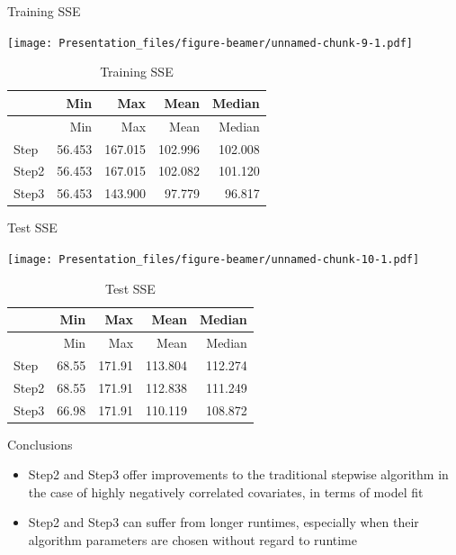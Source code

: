 \documentclass[ignorenonframetext,]{beamer}
\providecommand{\tightlist}{%
  \setlength{\itemsep}{0pt}\setlength{\parskip}{0pt}}
\begin{document}
\begin{frame}{Training SSE}

\texttt{[image: Presentation\_files/figure-beamer/unnamed-chunk-9-1.pdf]}

\begin{longtable}[]{@{}lrrrr@{}}
\caption{Training SSE}\tabularnewline
\toprule
& Min & Max & Mean & Median\tabularnewline
\midrule
\endfirsthead
\toprule
& Min & Max & Mean & Median\tabularnewline
\midrule
\endhead
Step & 56.453 & 167.015 & 102.996 & 102.008\tabularnewline
Step2 & 56.453 & 167.015 & 102.082 & 101.120\tabularnewline
Step3 & 56.453 & 143.900 & 97.779 & 96.817\tabularnewline
\bottomrule
\end{longtable}

\end{frame}

\begin{frame}{Test SSE}

\texttt{[image: Presentation\_files/figure-beamer/unnamed-chunk-10-1.pdf]}

\begin{longtable}[]{@{}lrrrr@{}}
\caption{Test SSE}\tabularnewline
\toprule
& Min & Max & Mean & Median\tabularnewline
\midrule
\endfirsthead
\toprule
& Min & Max & Mean & Median\tabularnewline
\midrule
\endhead
Step & 68.55 & 171.91 & 113.804 & 112.274\tabularnewline
Step2 & 68.55 & 171.91 & 112.838 & 111.249\tabularnewline
Step3 & 66.98 & 171.91 & 110.119 & 108.872\tabularnewline
\bottomrule
\end{longtable}

\end{frame}

\begin{frame}{Conclusions}

\begin{itemize}
\tightlist
\item
  Step2 and Step3 offer improvements to the traditional stepwise
  algorithm in the case of highly negatively correlated covariates, in
  terms of model fit
\item
  Step2 and Step3 can suffer from longer runtimes, especially when their
  algorithm parameters are chosen without regard to runtime
\end{itemize}

\end{frame}
\end{document}
